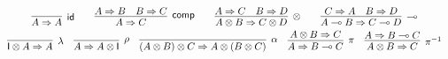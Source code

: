 \documentclass[copyright,creativecommons]{eptcs}
\theoremstyle{definition}
\newcommand{\id}{\mathsf{id}}
\newcommand{\ot}{\otimes}
\newcommand{\lolli}{\multimap}
\newcommand{\I}{\mathsf{I}}
\begin{document}
\begin{displaymath}
  \def\arraystretch{1.5}
  \begin{array}{c}
        \infer[\id]{A \Rightarrow A}{}
        \qquad
        \infer[\mathsf{comp}]{A \Rightarrow C}{
          A \Rightarrow B
          &
          B \Rightarrow C
        }
        \qquad
      \infer[\otimes]{A \ot B \Rightarrow C \ot D}{
        A \Rightarrow C
        &
        B \Rightarrow D
      }
      \qquad
      \infer[\lolli]{A \lolli B \Rightarrow C \lolli D}{
        C \Rightarrow A
        &
        B \Rightarrow D
      }
      \\
      \infer[\lambda]{\I \ot A \Rightarrow A}{}
      \quad
      \infer[\rho]{A \Rightarrow A \ot \I}{}
      \quad
      \infer[\alpha]{(A \ot B) \ot C \Rightarrow A \ot (B \ot C)}{}
      \quad
      \infer[\pi]{A \Rightarrow B \lolli C}{A \ot B \Rightarrow C}
      \quad
      \infer[\pi^{-1}]{A \ot B \Rightarrow C}{A \Rightarrow B \lolli C}
  \end{array}
\end{displaymath}
\end{document}
